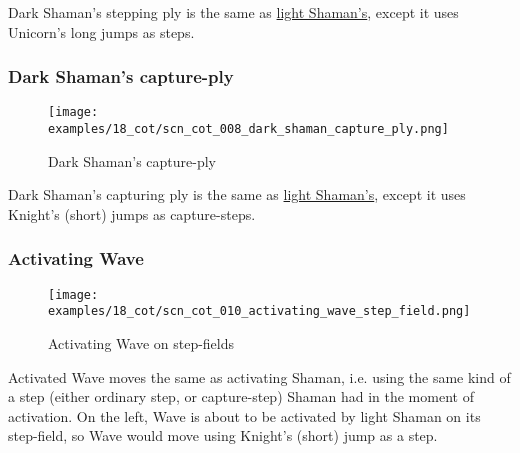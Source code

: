 \vspace*{-0.4\baselineskip}
Dark Shaman's stepping ply is the same as
\hyperref[fig:scn_cot_002_light_shaman_step_ply]{light Shaman's}, except it uses
Unicorn's long jumps as steps.

\vspace*{-1.4\baselineskip}
\subsubsection*{Dark Shaman's capture-ply}
\label{sec:Conquest of Tlalocan/Shaman/Movement/Dark Shaman's capture-ply}

\vspace*{-1.4\baselineskip}
\noindent
\begin{figure}[!h]
\texttt{[image: examples/18\_cot/scn\_cot\_008\_dark\_shaman\_capture\_ply.png]}
\vspace*{-1.4\baselineskip}
\caption{Dark Shaman's capture-ply}
\label{fig:scn_cot_008_dark_shaman_capture_ply}
\end{figure}

\vspace*{-0.4\baselineskip}
Dark Shaman's capturing ply is the same as
\hyperref[fig:scn_cot_004_light_shaman_capture_ply]{light Shaman's}, except it uses
Knight's (short) jumps as capture-steps.

\clearpage %

\subsubsection*{Activating Wave}
\label{sec:Conquest of Tlalocan/Shaman/Movement/Activating Wave}

\vspace*{-0.7\baselineskip}
\noindent
\begin{wrapfigure}[9]{l}{0.4\textwidth}
\centering
\texttt{[image: examples/18\_cot/scn\_cot\_010\_activating\_wave\_step\_field.png]}
\vspace*{-1.4\baselineskip}
\caption{Activating Wave on step-fields}
\label{fig:scn_cot_010_activating_wave_step_field}
\end{wrapfigure}
Activated Wave moves the same as activating Shaman, i.e. using the same kind of
a step (either ordinary step, or capture-step) Shaman had in the moment of activation. \newline
\indent
On the left, Wave is about to be activated by light Shaman on its step-field, so
Wave would move using Knight's (short) jump as a step.

